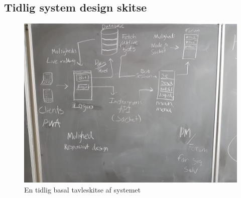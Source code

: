 \subsection{Tidlig system design skitse}
\label{appendix:earlysystem}
\begin{figure}[H]
    \centering
    \includegraphics[width = \linewidth]{Projectdoc/Assets/Illustrationer/SystemSketch.jpg} 
    \caption{En tidlig basal tavleskitse af systemet}
\end{figure}